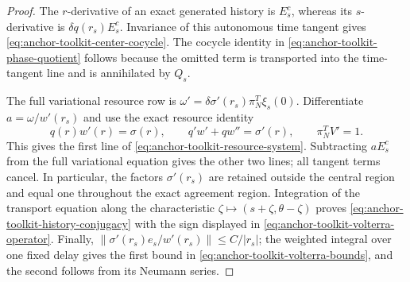 \begin{proof}
The \(r\)-derivative of an exact generated history is \(E_s^c\), whereas
its \(s\)-derivative is \(\delta q(r_s)E_s^c\).  Invariance of this
autonomous time tangent gives \cref{eq:anchor-toolkit-center-cocycle}.
The cocycle identity in \cref{eq:anchor-toolkit-phase-quotient} follows
because the omitted term is transported into the time-tangent line and is
annihilated by \(Q_s\).

The full variational resource row is
\(\omega'=\delta\sigma'(r_s)\pi_N^T\xi_s(0)\).
Differentiate \(a=\omega/w'(r_s)\) and use the exact resource identity
\[
 q(r)w'(r)=\sigma(r),
 \qquad q'w'+qw''=\sigma'(r),\qquad \pi_N^TV'=1.
\]
This gives the first line of \cref{eq:anchor-toolkit-resource-system}.
Subtracting \(aE_s^c\) from the full variational equation gives the other
two lines; all tangent terms cancel.  In particular, the factors
\(\sigma'(r_s)\) are retained outside the central region and equal one
throughout the exact agreement region.  Integration of the transport equation
along the characteristic
\(\zeta\mapsto(s+\zeta,\theta-\zeta)\) proves
\cref{eq:anchor-toolkit-history-conjugacy} with the sign displayed in
\cref{eq:anchor-toolkit-volterra-operator}.  Finally,
\(\|\sigma'(r_s)e_s/w'(r_s)\|\le C/|r_s|\); the weighted integral over one fixed delay
gives the first bound in \cref{eq:anchor-toolkit-volterra-bounds}, and the
second follows from its Neumann series.
\end{proof}

